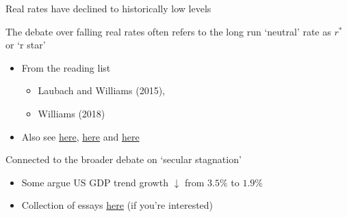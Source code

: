 \begin{frame}{Real rates have declined to historically low levels}

The debate over falling real rates often refers to the long run `neutral' rate as $r^{\ast}$ or `r star'
\begin{itemize}
\item	From the reading list
	\begin{itemize}
	\item	Laubach and Williams (2015),
	\item	Williams (2018)
	\end{itemize}
\item	Also see \href{https://voxeu.org/article/global-trends-interest-rates}{here}, \href{https://voxeu.org/article/causes-and-consequences-persistently-low-interest-rates}{here} and \href{https://www.niesr.ac.uk/sites/default/files/publications/Box\%20A\%20-\%20Decline\%20interest\%20rates.pdf}{here}
\end{itemize}	

\vspace{2mm}
Connected to the broader debate on `secular stagnation'
\begin{itemize}
\item	Some argue US GDP trend growth $\downarrow$ from $3.5\%$ to $1.9\%$
\item	Collection of essays \href{https://voxeu.org/content/secular-stagnation-facts-causes-and-cures}{here} (if you're interested)
\end{itemize}

\end{frame}


	
